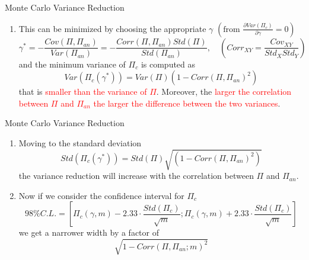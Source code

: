 \documentclass{beamer}
\begin{document}
\begin{frame}{Monte Carlo Variance Reduction}
	\begin{enumerate}\addtocounter{enumi}{2}
	\item This can be minimized by choosing the appropriate $\gamma$ $\left(\text{from }\frac{\partial Var(\Pi_c)}{\partial\gamma}=0\right)$
	\begin{equation*}
	\gamma^* = -\frac{Cov(\Pi, \Pi_{an})}{Var(\Pi_{an})} = -\frac{Corr(\Pi, \Pi_{an})Std(\Pi)}{Std(\Pi_{an})}, \quad \left(Corr_{XY}=\frac{Cov_{XY}}{Std_X Std_Y}\right)
	\end{equation*}
  	and the minimum variance of $\Pi_c$ is computed as
    \begin{equation*}
     Var(\Pi_c(\gamma^*)) = Var(\Pi)(1 - Corr(\Pi, \Pi_{an})^2)
    \end{equation*}
    that is \textcolor{red}{smaller than the variance of $\Pi$}. Moreover, the \textcolor{red}{larger the correlation between $\Pi$ and $\Pi_{an}$ the larger the difference between the two variances}.
  \end{enumerate}
\end{frame}

\begin{frame}{Monte Carlo Variance Reduction}
	\begin{enumerate}\addtocounter{enumi}{3}
  \item<1-> Moving to the standard deviation
	\begin{equation*}
		Std(\Pi_c(\gamma^*)) = Std(\Pi) \sqrt{(1 - Corr(\Pi, \Pi_{an})^2)}
	\end{equation*}
	the variance reduction will increase with the correlation between $\Pi$ and $\Pi_{an}$. 
	\item<2-> Now if we consider the confidence interval for $\Pi_c$ 
	\begin{equation*}
		98\% C.L. =\left[\Pi_c(\gamma,m) - 2.33\cdot\frac{Std(\Pi_c)}{\sqrt{m}};\Pi_c(\gamma,m) + 2.33\cdot\frac{Std(\Pi_c)}{\sqrt{m}}\right] 
	\end{equation*}
	we get a narrower width by a factor of
	\begin{equation*}
		\sqrt{1 - Corr(\Pi, \Pi_{an}; m)^2}
	\end{equation*}
	\end{enumerate}
\end{frame}
\end{document}
